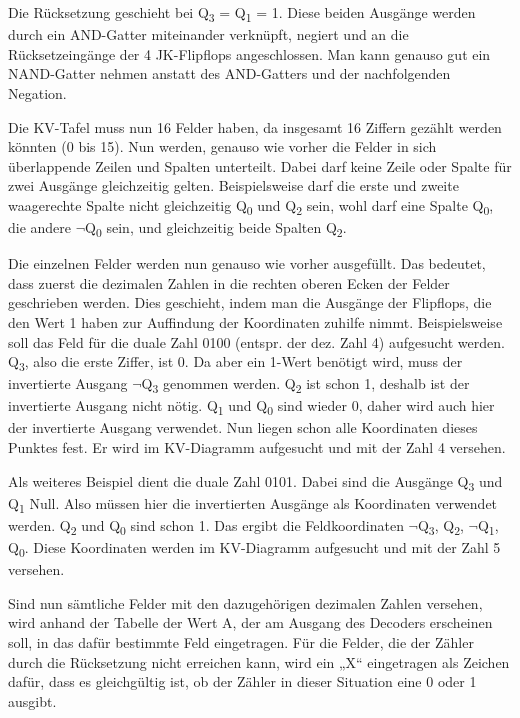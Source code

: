 Die Rücksetzung geschieht bei Q\textsubscript{3} = Q\textsubscript{1} = 1. Diese beiden Ausgänge werden durch ein AND-Gatter miteinander verknüpft, negiert und an die Rücksetzeingänge der 4 JK-Flipflops angeschlossen. Man kann genauso gut ein NAND-Gatter nehmen anstatt des AND-Gatters und der nachfolgenden Negation.

Die KV-Tafel muss nun 16 Felder haben, da insgesamt 16 Ziffern gezählt werden könnten (0 bis 15). Nun werden, genauso wie vorher die Felder in sich überlappende Zeilen und Spalten unterteilt. Dabei darf keine Zeile oder Spalte für zwei Ausgänge gleichzeitig gelten. Beispielsweise darf die erste und zweite waagerechte Spalte nicht gleichzeitig Q\textsubscript{0} und Q\textsubscript{2} sein, wohl darf eine Spalte Q\textsubscript{0}, die andere \ensuremath{\lnot}Q\textsubscript{0} sein, und gleichzeitig beide Spalten Q\textsubscript{2}.

Die einzelnen Felder werden nun genauso wie vorher ausgefüllt. Das bedeutet, dass zuerst die dezimalen Zahlen in die rechten oberen Ecken der Felder geschrieben werden. Dies geschieht, indem man die Ausgänge der Flipflops, die den Wert 1 haben zur Auffindung der Koordinaten zuhilfe nimmt. Beispielsweise soll das Feld für die duale Zahl 0100 (entspr. der dez. Zahl 4) aufgesucht werden. Q\textsubscript{3}, also die erste Ziffer, ist 0. Da aber ein 1-Wert benötigt wird, muss der invertierte Ausgang \ensuremath{\lnot}Q\textsubscript{3} genommen werden. Q\textsubscript{2} ist schon 1, deshalb ist der invertierte Ausgang nicht nötig. Q\textsubscript{1} und Q\textsubscript{0} sind wieder 0, daher wird auch hier der invertierte Ausgang verwendet. Nun liegen schon alle Koordinaten dieses Punktes fest. Er wird im KV-Diagramm aufgesucht und mit der Zahl 4 versehen.

Als weiteres Beispiel dient die duale Zahl 0101. Dabei sind die Ausgänge Q\textsubscript{3} und Q\textsubscript{1} Null. Also müssen hier die invertierten Ausgänge als Koordinaten verwendet werden. Q\textsubscript{2 }und Q\textsubscript{0} sind schon 1. Das ergibt die Feldkoordinaten \ensuremath{\lnot}Q\textsubscript{3}, Q\textsubscript{2}, \ensuremath{\lnot}Q\textsubscript{1}, Q\textsubscript{0}. Diese Koordinaten werden im KV-Diagramm aufgesucht und mit der Zahl 5 versehen.

Sind nun sämtliche Felder mit den dazugehörigen dezimalen Zahlen versehen, wird anhand der Tabelle der Wert A, der am Ausgang des Decoders erscheinen soll, in das dafür bestimmte Feld eingetragen. Für die Felder, die der Zähler durch die Rücksetzung nicht erreichen kann, wird ein „X“ eingetragen als Zeichen dafür, dass es gleichgültig ist, ob der Zähler in dieser Situation eine 0 oder 1 ausgibt.

